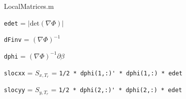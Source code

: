 \noindent LocalMatrices.m

\verb|edet| = $\vert \mathrm{det} \left(\nabla \Phi \right) \vert$

\verb|dFinv| = $\left(\nabla \Phi \right)^{-1}$

\verb|dphi| = $\left(\nabla \Phi \right)^{-1} \partial \beta$

\verb|slocxx| = $ S_{x,T_r}$ = \verb|1/2 * dphi(1,:)' * dphi(1,:) * edet|

\verb|slocyy| = $ S_{y,T_r}$ = \verb|1/2 * dphi(2,:)' * dphi(2,:) * edet|








